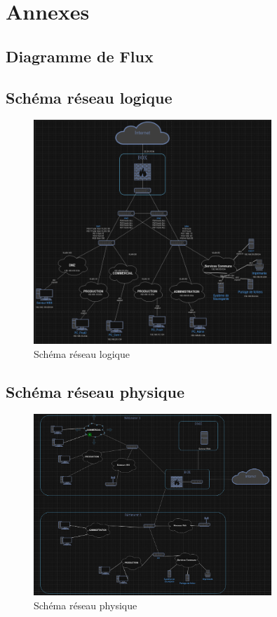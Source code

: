 \documentclass[a4paper,12pt]{report}
\begin{document}
    \chapter*{Annexes}
        \section{Diagramme de Flux}
        \section{Schéma réseau logique}
            \begin{figure}
                \centering
                \includegraphics[width=0.8\textwidth]{Images/Schema_logique.png}
                \caption{Schéma réseau logique}
            \end{figure}
        \section{Schéma réseau physique}
            \begin{figure}
                \centering
                \includegraphics[width=0.8\textwidth]{Images/Schema_physique.png}
                \caption{Schéma réseau physique}
            \end{figure}
\end{document}

